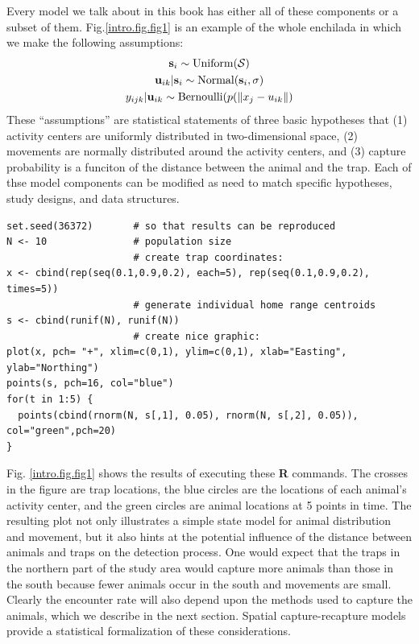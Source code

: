 Every model we talk about in this book has either all of these
components or a subset of them. Fig.\ref{intro.fig.fig1} is an example of the whole
enchilada in which we make the following assumptions:
\begin{gather}
{\bf s}_{i} \sim \mbox{Uniform}({\cal S}) \\
{\bf u}_{ik} | {\bf s}_{i} \sim \mbox{Normal}({\bf s}_{i}, \sigma) \\
y_{ijk} | {\bf u}_{ik} \sim \mbox{Bernoulli}(p(\| x_j - u_{ik} \|)
\end{gather}
These ``assumptions'' are statistical statements of three basic hypotheses
that (1) activity centers are uniformly distributed in two-dimensional
space, (2) movements are normally distributed around the activity
centers, and (3) capture probability is a funciton of the distance
between the animal and the trap. Each of thse model components can be
modified as need to match specific hypotheses, study designs, and data
structures.


{\small
\begin{verbatim}
set.seed(36372)       # so that results can be reproduced
N <- 10               # population size
                      # create trap coordinates:
x <- cbind(rep(seq(0.1,0.9,0.2), each=5), rep(seq(0.1,0.9,0.2), times=5))
                      # generate individual home range centroids
s <- cbind(runif(N), runif(N))
                      # create nice graphic:
plot(x, pch= "+", xlim=c(0,1), ylim=c(0,1), xlab="Easting", ylab="Northing")
points(s, pch=16, col="blue")
for(t in 1:5) {
  points(cbind(rnorm(N, s[,1], 0.05), rnorm(N, s[,2], 0.05)), col="green",pch=20)
}
\end{verbatim}
}


Fig. \ref{intro.fig.fig1} shows the results of executing these {\bf R} commands. The crosses
in the figure are trap locations, the blue circles are the locations
of each animal's activity center, and the green circles are animal
locations at 5 points in time.  The resulting plot not only
illustrates a simple state model for animal distribution and movement,
but it also hints at the potential influence of the distance between
animals and traps on the detection process. One would expect that the
traps in the northern part of the study area would capture more
animals than those in the south because fewer animals occur in the
south and movements are small. Clearly the encounter rate will also
depend upon the methods used to capture the animals, which we describe
in the next section.  Spatial capture-recapture models provide a
statistical formalization of these considerations.


